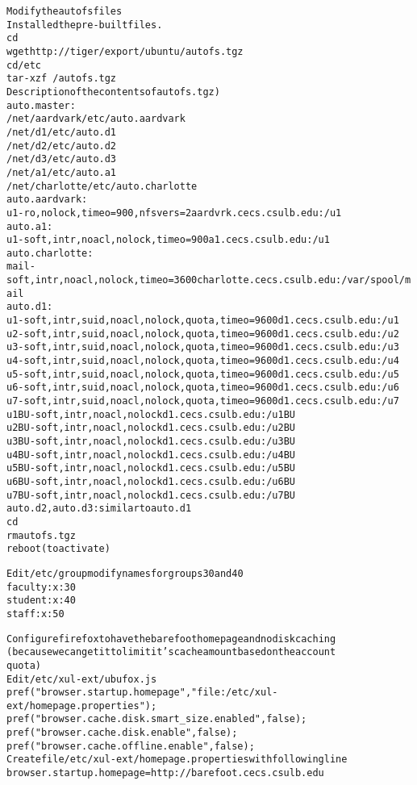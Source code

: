 \begin{alltt}
Modify the autofs files
 Installed the pre-built files.
  cd ~
  wget http://tiger/export/ubuntu/autofs.tgz
  cd /etc
  tar -xzf ~/autofs.tgz
 Description of the contents of autofs.tgz)
  auto.master: 
   /net/aardvark /etc/auto.aardvark
   /net/d1 /etc/auto.d1
   /net/d2 /etc/auto.d2
   /net/d3 /etc/auto.d3
   /net/a1 /etc/auto.a1
   /net/charlotte /etc/auto.charlotte
  auto.aardvark:
   u1 -ro,nolock,timeo=900,nfsvers=2 aardvrk.cecs.csulb.edu:/u1
  auto.a1:
   u1 -soft,intr,noacl,nolock,timeo=900 a1.cecs.csulb.edu:/u1
  auto.charlotte:
   mail -soft,intr,noacl,nolock,timeo=3600 charlotte.cecs.csulb.edu:/var/spool/mail
  auto.d1:
   u1 -soft,intr,suid,noacl,nolock,quota,timeo=9600 d1.cecs.csulb.edu:/u1
   u2 -soft,intr,suid,noacl,nolock,quota,timeo=9600 d1.cecs.csulb.edu:/u2
   u3 -soft,intr,suid,noacl,nolock,quota,timeo=9600 d1.cecs.csulb.edu:/u3
   u4 -soft,intr,suid,noacl,nolock,quota,timeo=9600 d1.cecs.csulb.edu:/u4
   u5 -soft,intr,suid,noacl,nolock,quota,timeo=9600 d1.cecs.csulb.edu:/u5
   u6 -soft,intr,suid,noacl,nolock,quota,timeo=9600 d1.cecs.csulb.edu:/u6
   u7 -soft,intr,suid,noacl,nolock,quota,timeo=9600 d1.cecs.csulb.edu:/u7
   u1BU -soft,intr,noacl,nolock d1.cecs.csulb.edu:/u1BU
   u2BU -soft,intr,noacl,nolock d1.cecs.csulb.edu:/u2BU
   u3BU -soft,intr,noacl,nolock d1.cecs.csulb.edu:/u3BU
   u4BU -soft,intr,noacl,nolock d1.cecs.csulb.edu:/u4BU
   u5BU -soft,intr,noacl,nolock d1.cecs.csulb.edu:/u5BU
   u6BU -soft,intr,noacl,nolock d1.cecs.csulb.edu:/u6BU
   u7BU -soft,intr,noacl,nolock d1.cecs.csulb.edu:/u7BU
  auto.d2,auto.d3: similar to auto.d1
  cd ~
  rm autofs.tgz
  reboot (to activate)

Edit /etc/group modify names for groups 30 and 40
 faculty:x:30
 student:x:40
 staff:x:50

Configure firefox to have the barefoot home page and no disk caching
 (because we can get it to limit it's cache amount based on the account
  quota)
 Edit /etc/xul-ext/ubufox.js
  pref("browser.startup.homepage", "file:/etc/xul-ext/homepage.properties");
  pref("browser.cache.disk.smart_size.enabled", false);
  pref("browser.cache.disk.enable", false);
  pref("browser.cache.offline.enable", false);
 Create file /etc/xul-ext/homepage.properties with following line
  browser.startup.homepage=http://barefoot.cecs.csulb.edu
 

\end{alltt}
